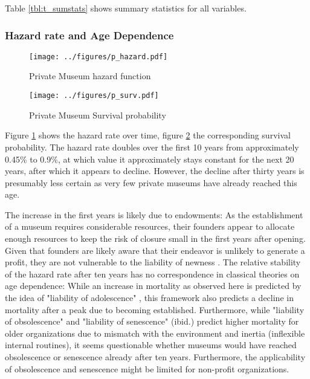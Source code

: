 \documentclass[11pt]{article}
\begin{document}
Table \ref{tbl:t_sumstats} shows summary statistics for all variables.

\subsubsection*{Hazard rate and Age Dependence}


\begin{figure}[htbp]
\centering
\texttt{[image: ../figures/p\_hazard.pdf]}
\caption{\label{fig:p_hazard}Private Museum hazard function}
\end{figure}

\begin{figure}[htbp]
\centering
\texttt{[image: ../figures/p\_surv.pdf]}
\caption{\label{fig:p_surv}Private Museum Survival probability}
\end{figure}


Figure \ref{fig:p_hazard} shows the hazard rate over time, figure \ref{fig:p_surv} the corresponding survival probability.
The hazard rate doubles over the first 10 years from approximately 0.45\% to 0.9\%, at which value it approximately stays constant for the next 20 years, after which it appears to decline.
However, the decline after thirty years is presumably less certain as very few private museums have already reached this age.


The increase in the first years is likely due to endowments: As the establishment of a museum requires considerable resources, their founders appear to allocate enough resources to keep the risk of closure small in the first years after opening.
Given that founders are likely aware that their endeavor is unlikely to generate a profit, they are not vulnerable to the liability of newness \parencite{Stinchcombe_1965_structure}.
The relative stability of the hazard rate after ten years has no correspondence in classical theories on age dependence:
While an increase in mortality as observed here is predicted by the idea of "liability of adolescence" \parencite{Carroll_Khessina_2019_demography}, this framework also predicts a decline in mortality after a peak due to becoming established.
Furthermore, while "liability of obsolescence" and "liability of senescence" (ibid.) predict higher mortality for older organizations due to mismatch with the environment and inertia (inflexible internal routines), it seems questionable whether museums would have reached obsolescence or senescence already after ten years.
Furthermore, the applicability of obsolescence and senescence might be limited for non-profit organizations.
\end{document}
